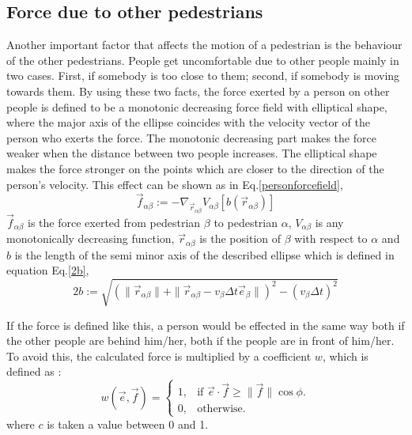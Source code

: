 \documentclass[11pt]{article}
\begin{document}
\subsection{Force due to other pedestrians}
Another important factor that affects the motion of a pedestrian is the behaviour of the other pedestrians. People get uncomfortable due to other people mainly in two cases. First, if somebody is too close to them; second, if somebody is moving towards them.
By using these two facts, the force exerted by a person on other people is defined to be a monotonic decreasing force field with elliptical shape, where the major axis of the ellipse coincides with the velocity vector of the person who exerts the force. The monotonic decreasing part makes the force weaker when the distance between two people increases. The elliptical shape makes the force stronger on the points which are closer to the direction of the person's velocity. This effect can be shown as in Eq.\ref{personforcefield},
\begin{equation}
    \vec{f}_{\alpha\beta}:=-\nabla_{\vec{r}_{\alpha\beta}}V_{\alpha\beta}[b(\vec{r}_{\alpha\beta})]
\label{personforcefield}
\end{equation}
$\vec{f}_{\alpha\beta}$ is the force exerted from pedestrian $\beta$ to pedestrian $\alpha$, $V_{\alpha\beta}$ is any monotonically decreasing function, $\vec{r}_{\alpha\beta}$ is the position of $\beta$ with respect to $\alpha$ and $b$ is the length of the semi minor axis of the described ellipse which is defined in equation Eq.\ref{2b},
\begin{equation}
    2b:=\sqrt{(\|\vec{r}_{\alpha\beta}\|+\|\vec{r}_{\alpha\beta}-v_\beta\Delta t\vec{e}_{\beta}\|)^2-(v_\beta\Delta t)^2}
    \label{2b}
\end{equation}

If the force is defined like this, a person would be effected in the same way both if the other people are behind him/her, both if the people are in front of him/her. To avoid this, the calculated force is multiplied by a coefficient $w$, which is defined as : 
\begin{equation}
    w(\vec{e},\vec{f})=\begin{cases}
    1, & \text{if $\vec{e}\cdot\vec{f}\geq\|\vec{f}\|\cos{\phi}$}.\\
    0, & \text{otherwise}.
  \end{cases}
\end{equation}
where $c$ is taken a value between 0 and 1.
\end{document}
